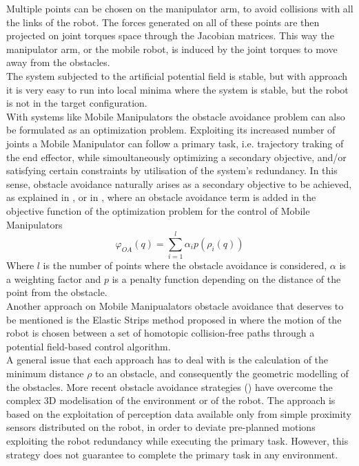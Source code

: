 Multiple points can be chosen on the manipulator arm, to avoid collisions with all the links of the robot. The forces generated on all of these points are then projected on joint torques space through the Jacobian matrices. This way the manipulator arm, or the mobile robot, is induced by the joint torques to move away from the obstacles.\\
The system subjected to the artificial potential field is stable, but with approach it is very easy to run into local minima where the system is stable, but the robot is not in the target configuration.\\
With systems like Mobile Manipulators the obstacle avoidance problem can also be formulated as an optimization problem. Exploiting its increased number of joints a Mobile Manipulator can follow a primary task, i.e. trajectory traking of the end effector, while simoultaneously optimizing a secondary objective, and/or satisfying certain constraints by utilisation of the system's redundancy. In this sense, obstacle avoidance naturally arises as a secondary objective to be achieved, as explained in \cite{yamamoto2},\cite{tanner2000} or in \cite{perdereau2002}, where an obstacle avoidance term is added in the objective function of the optimization problem for the control of Mobile Manipulators
\begin{equation}
	\varphi_{OA}(q)=\sum_{i=1}^{l}\alpha_ip(\rho_i(q))
\end{equation}
Where $l$ is the number of points where the obstacle avoidance is considered, $\alpha$ is a weighting factor and $p$ is a penalty function depending on the distance of the point from the obstacle.\\
Another approach on Mobile Manipualators obstacle avoidance that deserves to be mentioned is the Elastic Strips method proposed in \cite{brockKhatib} where the motion of the robot is chosen between a set of homotopic collision-free paths through a potential field-based control algorithm. \\
A general issue that each approach has to deal with is the calculation of the minimum distance $\rho$ to an obstacle, and consequently the geometric modelling of the obstacles. More recent obstacle avoidance strategies (\cite{falconatale}) have overcome the complex 3D modelisation of the environment or of the robot. The approach is based on the exploitation of perception data available only from simple proximity sensors distributed on the robot, in order to deviate pre-planned motions exploiting the robot redundancy while executing the primary task. However, this strategy does not guarantee to complete the primary task in any environment.


